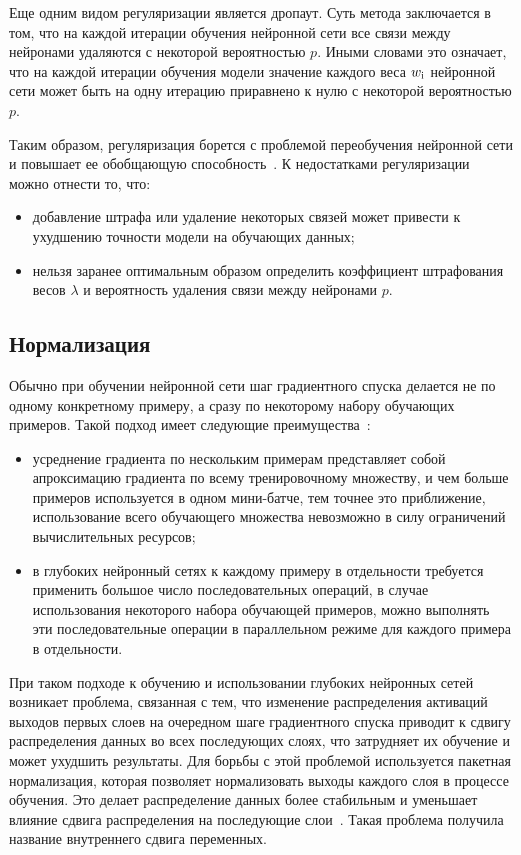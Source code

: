 Еще одним видом регуляризации является дропаут. Суть метода заключается в том, что на каждой итерации обучения нейронной сети все связи между нейронами удаляются с некоторой вероятностью $p$. Иными словами это означает, что на каждой итерации обучения модели значение каждого веса $w_{\rm{i}}$ нейронной сети может быть на одну итерацию приравнено к нулю с некоторой вероятностью $p$.

Таким образом, регуляризация борется с проблемой переобучения нейронной сети и повышает ее обобщающую способность~\cite{regulisation}. К недостатками регуляризации можно отнести то, что:
\begin{itemize}
	\item добавление штрафа или удаление некоторых связей может привести к ухудшению точности модели на обучающих данных;
	\item нельзя заранее оптимальным образом определить коэффициент штрафования весов $\lambda$ и вероятность удаления связи между нейронами $p$.
\end{itemize}

\subsection{Нормализация}\label{sec:normalisation}
Обычно при обучении нейронной сети шаг градиентного спуска делается не по одному конкретному примеру, а сразу по некоторому набору обучающих примеров. Такой подход имеет следующие преимущества~\cite{regulisation}:
\begin{itemize}
	\item усреднение градиента по нескольким примерам представляет собой апроксимацию градиента по всему тренировочному множеству, и чем больше примеров используется в одном мини-батче, тем точнее это приближение, использование всего обучающего множества невозможно в силу ограничений вычислительных ресурсов;
	\item в глубоких нейронный сетях к каждому примеру в отдельности требуется применить большое число последовательных операций, в случае использования некоторого набора обучающей примеров, можно выполнять эти последовательные операции в параллельном режиме для каждого примера в отдельности.
\end{itemize}

При таком подходе к обучению и использовании глубоких нейронных сетей возникает проблема, связанная с тем, что изменение распределения активаций выходов первых слоев на очередном шаге градиентного спуска приводит к сдвигу распределения данных во всех последующих слоях, что затрудняет их обучение и может ухудшить результаты. Для борьбы с этой проблемой используется пакетная нормализация, которая позволяет нормализовать выходы каждого слоя в процессе обучения. Это делает распределение данных более стабильным и уменьшает влияние сдвига распределения на последующие слои~\cite{burkholz2024batch}. Такая проблема получила название внутреннего сдвига переменных.

